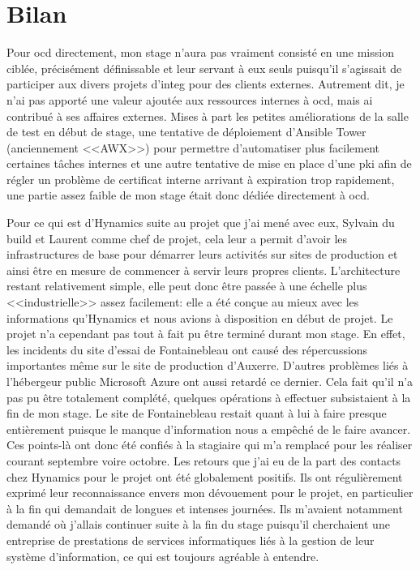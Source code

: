\documentclass[12pt, oneside, a4paper, titlepage]{report}
\begin{document}
\chapter{Bilan}%
\label{cha:bilan}

Pour \acrlong{ocd} directement, mon stage n'aura pas vraiment consisté en une
mission ciblée, précisément définissable et leur servant à eux seuls puisqu'il
s'agissait de participer aux divers projets d'\gls{integ} pour des clients
externes. Autrement dit, je n'ai pas apporté une valeur ajoutée aux ressources
internes à \gls{ocd}, mais ai contribué à ses affaires externes. Mises à part
les petites améliorations de la salle de test en début de stage, une tentative
de déploiement d'Ansible Tower (anciennement <<AWX>>) pour permettre
d'automatiser plus facilement certaines tâches internes et une autre tentative
de mise en place d'une \gls{pki} afin de régler un problème de certificat
interne arrivant à expiration trop rapidement, une partie assez faible de mon
stage était donc dédiée directement à \gls{ocd}.

Pour ce qui est d'Hynamics suite au projet que j'ai mené avec eux, Sylvain du
\gls{build} et Laurent comme chef de projet, cela leur a permit d'avoir les
infrastructures de base pour démarrer leurs activités sur sites de production et
ainsi être en mesure de commencer à servir leurs propres clients. L'architecture
restant relativement simple, elle peut donc être passée à une échelle plus
<<industrielle>> assez facilement: elle a été conçue au mieux avec les
informations qu'Hynamics et nous avions à disposition en début de projet. Le
projet n'a cependant pas tout à fait pu être terminé durant mon stage. En effet,
les incidents du site d'essai de Fontainebleau ont causé des répercussions
importantes même sur le site de production d'Auxerre. D'autres problèmes liés à
l'hébergeur public Microsoft Azure ont aussi retardé ce dernier. Cela fait qu'il
n'a pas pu être totalement complété, quelques opérations à effectuer
subsistaient à la fin de mon stage. Le site de Fontainebleau restait quant à lui
à faire presque entièrement puisque le manque d'information nous a empêché de le
faire avancer. Ces points-là ont donc été confiés à la stagiaire qui m'a
remplacé pour les réaliser courant septembre voire octobre. Les retours que j'ai
eu de la part des contacts chez Hynamics pour le projet ont été globalement
positifs. Ils ont régulièrement exprimé leur reconnaissance envers mon
dévouement pour le projet, en particulier à la fin qui demandait de longues et
intenses journées. Ils m'avaient notamment demandé où j'allais continuer suite à
la fin du stage puisqu'il cherchaient une entreprise de prestations de services
informatiques liés à la gestion de leur système d'information, ce qui est
toujours agréable à entendre.
\end{document}

